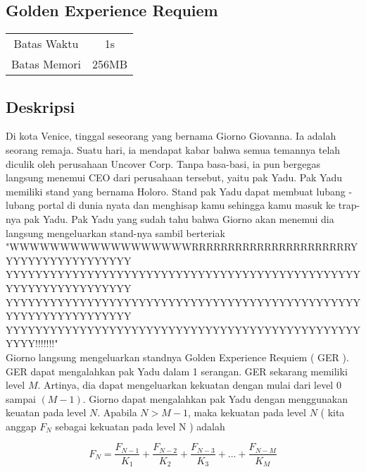 \documentclass{article}
\begin{document}
\begin{center}

    
    \section*{Golden Experience Requiem} %

    \begin{tabular}{ | c c | }
        \hline
        Batas Waktu  & 1s \\    %
        Batas Memori & 256MB \\  %
        \hline
    \end{tabular}
\end{center}

\subsection*{Deskripsi}
Di kota Venice, tinggal seseorang yang bernama Giorno Giovanna. Ia adalah seorang remaja. Suatu hari, ia mendapat kabar bahwa semua temannya telah diculik oleh perusahaan Uncover Corp. Tanpa basa-basi, ia pun bergegas langsung menemui CEO dari perusahaan tersebut, yaitu pak Yadu. Pak Yadu memiliki stand yang bernama Holoro. Stand pak Yadu dapat membuat lubang - lubang portal di dunia nyata dan menghisap kamu sehingga kamu masuk ke trap-nya pak Yadu. Pak Yadu yang sudah tahu bahwa Giorno akan menemui dia langsung mengeluarkan stand-nya sambil berteriak\\

"WWWWWWWWWWWWWWWWWWRRRRRRRRRRRRRRRRRRRRRRYYYYYYYYYYYYYYYYYY\\
YYYYYYYYYYYYYYYYYYYYYYYYYYYYYYYYYYYYYYYYYYYYYYYYYYYYYYYYYYYYYYYYY\\
YYYYYYYYYYYYYYYYYYYYYYYYYYYYYYYYYYYYYYYYYYYYYYYYYYYYYYYYYYYYYYYYY\\
YYYYYYYYYYYYYYYYYYYYYYYYYYYYYYYYYYYYYYYYYYYYYYYYYYYY!!!!!!!"\\

Giorno langsung mengeluarkan standnya Golden Experience Requiem ( GER ). GER dapat mengalahkan pak Yadu dalam 1 serangan. GER sekarang memiliki level $M$. Artinya, dia dapat mengeluarkan kekuatan dengan mulai dari level $0$ sampai $( M - 1 )$. Giorno dapat mengalahkan pak Yadu dengan menggunakan keuatan pada level $N$. Apabila $N > M-1$, maka kekuatan pada level $N$ ( kita anggap $F_N$ sebagai kekuatan pada level N ) adalah

\[F_N = \frac{F_{N-1}}{K_1} + \frac{F_{N-2}}{K_2} + \frac{F_{N-3}}{K_3} + ... +\frac{F_{N-M}}{K_M} \]
\end{document}
